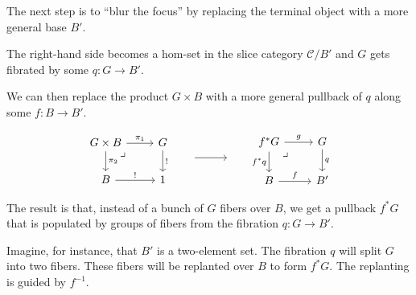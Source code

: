 \documentclass[DaoFP]{subfiles}
\begin{document}
The next step is to ``blur the focus'' by replacing the terminal object with a more general base $B'$. 

The right-hand side becomes a hom-set in the slice category $\mathcal{C}/B'$ and $G$ gets fibrated by some $q \colon G \to B'$. 

We can then replace the product $G \times B$ with a more general pullback of $q$ along some $f \colon B \to B'$.

\[
 \begin{tikzcd}
 G \times B
 \arrow[dr, phantom,  , very near start, "\lrcorner"]
\arrow[d, "\pi_2"]
 \arrow[r, "\pi_1"]
 & G
 \arrow[d, "!"]
 \\
 B
 \arrow[r, "!"]
 &
 1
 \end{tikzcd}
 \hspace{20pt}
\begin{tikzpicture}
\draw[->] (0, 0) -- (1, 0);
\end{tikzpicture}
 \hspace{20pt}
 \begin{tikzcd}
 f^* G
\arrow[dr, phantom,  , very near start, "\lrcorner"]
 \arrow[d, "f^*q"']
 \arrow[r, "g"]
 & G
 \arrow[d, "q"]
 \\
 B
 \arrow[r, "f"]
 &B'
\end{tikzcd}
\]

The result is that, instead of a bunch of $G$ fibers over $B$, we get a pullback $f^* G$ that is populated by groups of fibers from the fibration $q \colon G \to B'$. 

Imagine, for instance, that $B'$ is a two-element set. The fibration $q$ will split $G$ into two fibers. These fibers will be replanted over $B$ to form $f^* G$. The replanting is guided by $f^{-1}$. 
\end{document}
